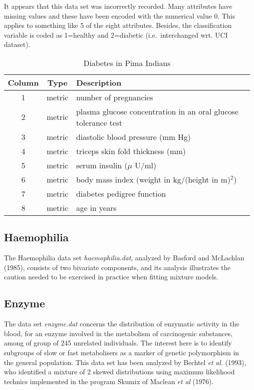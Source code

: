 It appears that this data set was incorrectly recorded. Many
attributes have missing values and these have been encoded with the
numerical value 0. This applies to something like 5 of the eight
attributes. Besides, the classification variable is coded as 1=healthy
and 2=diabetic (i.e.\ interchanged wrt. UCI dataset).
\begin{table}[!h]
    \caption{Diabetes in Pima Indians}
    \begin{center}
        \begin{tabular}{|c|c|l|}
            \hline
            Column & Type   & Description \\
            \hline
            1 & metric & number of pregnancies \\
            2 & metric & plasma glucose concentration in an oral glucose tolerance test \\
            3 & metric & diastolic blood pressure (mm Hg) \\
            4 & metric & triceps skin fold thickness (mm) \\
            5 & metric & serum insulin ($\mu$ U/ml) \\
            6 & metric & body mass index (weight in kg/(height in m)$^2$) \\
            7 & metric & diabetes pedigree function \\
            8 & metric & age in years \\
            \hline
        \end{tabular}
    \end{center}
\end{table}

\subsection*{Haemophilia}
The Haemophilia data set {\it haemophilia.dat}, analyzed by Basford
and McLachlan (1985), consists of two bivariate components,
and its analysis illustrates the caution needed to be exercised in
practice when fitting mixture models.


\subsection*{Enzyme}

The data set {\it enzyme.dat} concerns the distribution of enzymatic
activity in the blood, for an enzyme involved in the metabolism of
carcinogenic substances, among of group of 245 unrelated
individuals. The interest here is to identify subgroups of slow or
fast metabolisers as a marker of genetic polymorphism in the general
population.  This data set has been analyzed by Bechtel {\em et al.}
(1993), who identified a mixture of 2 skewed distributions using
maximum likelihood technics implemented in the program {\sc Skumix}
of Maclean {\em et al} (1976).

